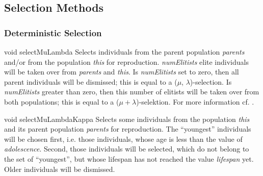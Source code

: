 \subsection{Selection Methods}

\subsubsection{Deterministic Selection}

\setNormalInstance
\setCorrectWidthThree{8pt}
\printMethodWithParamsSaved
{void}
{}
{selectMuLambda}
{Selects individuals from the parent population {\em parents} and/or
 from the population {\em this} for reproduction. {\em numElitists}
 elite individuals will be taken over from {\em parents} and {\em this}.
 Is {\em numElitists} set to zero, then all parent individuals will be
 dismissed; this is equal to a ($\mu$, $\lambda$)-selection. Is
 {\em numElitists} greater than zero, then this number of elitists
 will be taken over from both populations; this is equal to a 
 ($\mu + \lambda$)-selektion.
 For more information cf. \cite{Baeck}.}
{}
\setCorrectWidthThree{4pt}

\clearpage

\setNormalInstance
\setCorrectWidthThree{8pt}
\printMethodWithParamsSaved
{void}
{}
{selectMuLambdaKappa}
{Selects some individuals from the population {\em this} and its
 parent population {\em parents} for reproduction. The ``youngest''
 individuals will be chosen first, i.e. those individuals,
 whose age is less than the value of {\em adolescence}. Second,
 those individuals will be selected, which do not belong to the
 set of ``youngest'', but whose lifespan has not reached the value 
 {\em lifespan} yet. Older individuals will be dismissed.}
{}
\setCorrectWidthThree{4pt}

